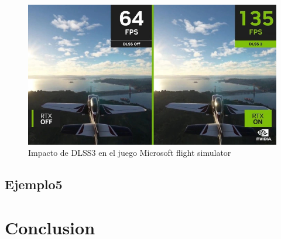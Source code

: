 \documentclass[runningheads]{llncs} %
\begin{document}
\begin{figure}
    \centering
    \includegraphics[scale=0.4]{ej2-dlss3.jpg}
    \caption{Impacto de DLSS3 en el juego Microsoft flight simulator
    \cite{img2-dlss3}}
    \label{fig:ej2-dlss3}
\end{figure}

\subsection{Ejemplo5}
\section{Conclusion}

\newpage
\printbibliography
\end{document}
